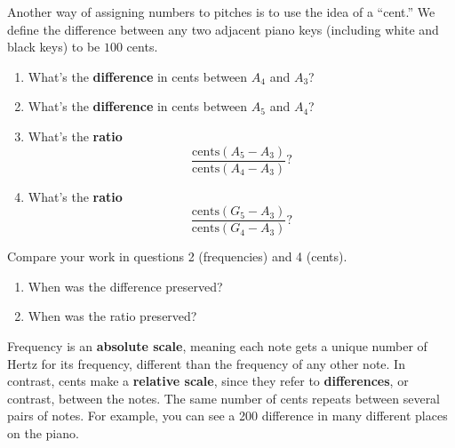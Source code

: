 \documentclass[12pt,noauthor,nooutcomes,handout,hints]{ximera}
\begin{document}
\begin{question}
Another way of assigning numbers to pitches is to use the idea of a ``cent.'' We define the difference between any two adjacent piano keys (including white and black keys) to be $100$ cents. 
\begin{enumerate}
\item What's the \textbf{difference} in cents between $A_4$ and $A_3$?

\answerlines

\item What's the \textbf{difference} in cents between $A_5$ and $A_4$?


\answerlines


\item What's the \textbf{ratio}
\[
\frac{\mathrm{cents}(A_5-A_3)}{\mathrm{cents}(A_4-A_3)}?
\]

\answerlines


\item What's the \textbf{ratio}
\[
\frac{\mathrm{cents}(G_5-A_3)}{\mathrm{cents}(G_4-A_3)}?
\]


\answerlines

\end{enumerate}


\begin{question}
Compare your work in questions 2 (frequencies) and 4 (cents).
\begin{enumerate}
    \item When was the difference preserved?
    \item When was the ratio preserved?
\end{enumerate}
\end{question}


Frequency is an \textbf{absolute scale}, meaning each note gets a unique number of Hertz for its frequency, different than the frequency of any other note. In contrast, cents make a \textbf{relative scale}, since they refer to \textbf{differences}, or contrast, between the notes. The same number of cents repeats between several pairs of notes. For example, you can see a 200 difference in many different places on the piano. 

\end{question}
\end{document}

